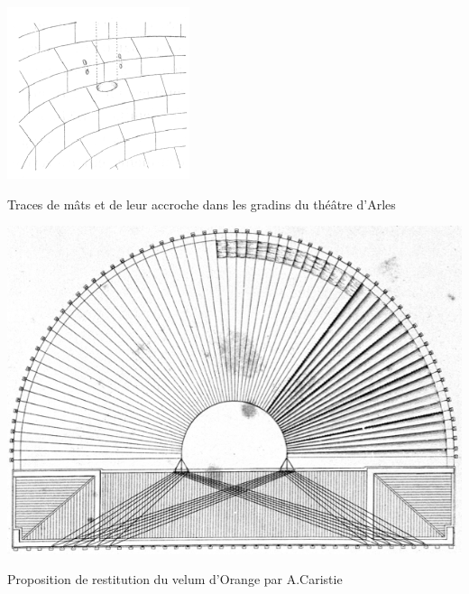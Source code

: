 		
	\begin{figureth}
		\begin{subfigureth}{0.35\textwidth}
			\includegraphics[width=\linewidth]{images/velumArles}
		\caption[Traces de mâts et de leur accroche dans les gradins du théâtre d'Arles]{Traces de mâts et de leur accroche dans les gradins du théâtre d'Arles \footnotemark}
			\label{velumArles}
		\end{subfigureth}	
		\qquad
		\begin{subfigureth}{0.55\textwidth}
			\includegraphics[width=\linewidth]{images/velumCaristie}
		\caption[Proposition de restitution du velum d'Orange par A.Caristie]{Proposition de restitution du velum d'Orange par A.Caristie \footnotemark}
		\label{velumCaristie}
		\end{subfigureth}
	\end{figureth}
\addtocounter{footnote}{-1}
\addtocounter{footnote}{1}
				

